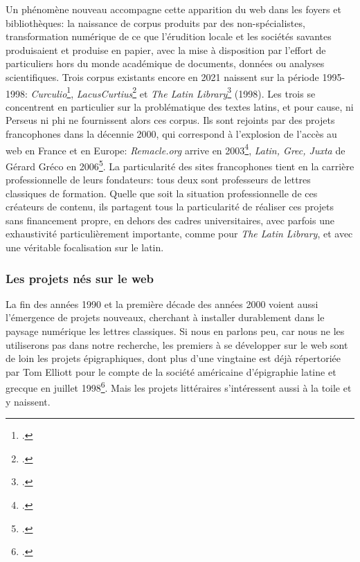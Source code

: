Un phénomène nouveau accompagne cette apparition du web dans les foyers et bibliothèques: la naissance de corpus produits par des non-spécialistes, transformation numérique de ce que l'érudition locale et les sociétés savantes produisaient et produise en papier, avec la mise à disposition par l'effort de particuliers hors du monde académique de documents, données ou analyses scientifiques. Trois corpus existants encore en 2021 naissent sur la période 1995-1998: \textit{Curculio}\footcite{hendry_curculio_1995}, \textit{LacusCurtius}\footcite{lomarcan_lacuscurtius_1999} et \textit{The Latin Library}\footcite{carey_latin_1998} (1998). Les trois se concentrent en particulier sur la problématique des textes latins, et pour cause, ni Perseus ni \acrshort{phi} ne fournissent alors ces corpus. Ils sont rejoints par des projets francophones dans la décennie 2000, qui correspond à l'explosion de l'accès au web en France et en Europe: \textit{Remacle.org} arrive en 2003\footcite{philippe_remacle_site_2008}, \textit{Latin, Grec, Juxta} de Gérard Gréco en 2006\footcite{gerard_greco_latin_2006}. La particularité des sites francophones tient en la carrière professionnelle de leurs fondateurs: tous deux sont professeurs de lettres classiques de formation. Quelle que soit la situation professionnelle de ces créateurs de contenu, ils partagent tous la particularité de réaliser ces projets sans financement propre, en dehors des cadres universitaires, avec parfois une exhaustivité particulièrement importante, comme pour \textit{The Latin Library}, et avec une véritable focalisation sur le latin.

\subsubsection{Les projets nés sur le web}

La fin des années 1990 et la première décade des années 2000 voient aussi l'émergence de projets nouveaux, cherchant à installer durablement dans le paysage numérique les lettres classiques. Si nous en parlons peu, car nous ne les utiliserons pas dans notre recherche, les premiers à se développer sur le web sont de loin les projets épigraphiques, dont plus d'une vingtaine est déjà répertoriée par Tom Elliott pour le compte de la société américaine d'épigraphie latine et grecque en juillet 1998\footcite{elliott_links_1998}. Mais les projets littéraires s'intéressent aussi à la toile et y naissent.


